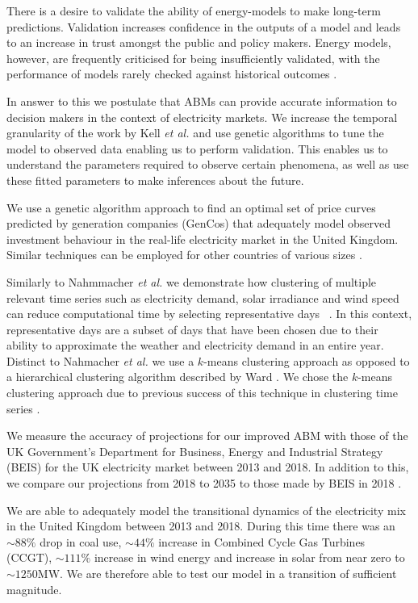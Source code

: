 There is a desire to validate the ability of energy-models to make long-term predictions. Validation increases confidence in the outputs of a model and leads to an increase in trust amongst the public and policy makers. Energy models, however, are frequently criticised for being insufficiently validated, with the performance of models rarely checked against historical outcomes \cite{Beckman2011}.

In answer to this we postulate that ABMs can provide accurate information to decision makers in the context of electricity markets. We increase the temporal granularity of the work by Kell \textit{et al.} \cite{Kell} and use genetic algorithms to tune the model to observed data enabling us to perform validation. This enables us to understand the parameters required to observe certain phenomena, as well as use these fitted parameters to make inferences about the future. 




We use a genetic algorithm approach to find an optimal set of price curves predicted by generation companies (GenCos) that  adequately model observed investment behaviour in the real-life electricity market in the United Kingdom. Similar techniques can be employed for other countries of various sizes \cite{Kell}. 


Similarly to Nahmmacher \textit{et al.} we demonstrate how clustering of multiple relevant time series such as electricity demand, solar irradiance and wind speed can reduce computational time by selecting representative days ~\cite{Nahmmacher2016}. In this context, representative days are a subset of days that have been chosen due to their ability to approximate the weather and electricity demand in an entire year. Distinct to Nahmacher \textit{et al.} we use a $k$-means clustering approach \cite{forgy65} as opposed to a hierarchical clustering algorithm described by Ward \cite{doi:10.1080/01621459.1963.10500845}. We chose the $k$-means clustering approach due to previous success of this technique in clustering time series \cite{Kell2018a}. 

We measure the accuracy of projections for our improved ABM with those of the UK Government's Department for Business, Energy and Industrial Strategy (BEIS) for the UK electricity market between 2013 and 2018. In addition to this, we compare our projections from 2018 to 2035 to those made by BEIS in 2018 \cite{DBEIS2019}.

We are able to adequately model the transitional dynamics of the electricity mix in the United Kingdom between 2013 and 2018. During this time there was an ${\sim}88\%$ drop in coal use, ${\sim}44\%$ increase in Combined Cycle Gas Turbines (CCGT), ${\sim}111\% $ increase in wind energy and increase in solar from near zero to ${\sim}1250$MW. We are therefore able to test our model in a transition of sufficient magnitude.





